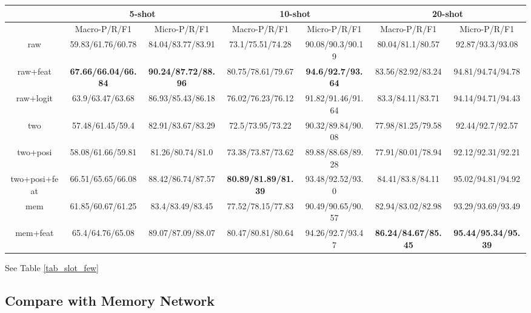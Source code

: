 \begin{table*}
\setlength{\tabcolsep}{0.23em}
\centering
\small{
\begin{tabular}{|c|c|c|c|c|c|c|}

\hline
  & \multicolumn{2}{|c|}{5-shot} & \multicolumn{2}{|c|}{10-shot} & \multicolumn{2}{|c|}{20-shot}  \\
 \hline
  & Macro-P/R/F1 & Micro-P/R/F1 & Macro-P/R/F1 & Micro-P/R/F1  & Macro-P/R/F1 & Micro-P/R/F1   \\
\hline
raw & 59.83/61.76/60.78 & 84.04/83.77/83.91 & 73.1/75.51/74.28  & 90.08/90.3/90.19 & 80.04/81.1/80.57 & 92.87/93.3/93.08 \\
\hline
raw+feat & \textbf{67.66/66.04/66.84} & \textbf{90.24/87.72/88.96} & 80.75/78.61/79.67 & \textbf{94.6/92.7/93.64} & 83.56/82.92/83.24 & 94.81/94.74/94.78 \\
\hline
raw+logit & 63.9/63.47/63.68 & 86.93/85.43/86.18 & 76.02/76.23/76.12 & 91.82/91.46/91.64  & 83.3/84.11/83.71 & 94.14/94.71/94.43 \\
\hline
two & 57.48/61.45/59.4 & 82.91/83.67/83.29 & 72.5/73.95/73.22 & 90.32/89.84/90.08 & 77.98/81.25/79.58 & 92.44/92.7/92.57 \\
\hline
two+posi & 58.08/61.66/59.81 & 81.26/80.74/81.0 & 73.38/73.87/73.62 & 89.88/88.68/89.28 & 77.91/80.01/78.94 & 92.12/92.31/92.21 \\
\hline
two+posi+feat & 66.51/65.65/66.08 & 88.42/86.74/87.57 & \textbf{80.89/81.89/81.39} & 93.48/92.52/93.0 & 84.41/83.8/84.11 & 95.02/94.81/94.92\\
\hline
mem & 61.85/60.67/61.25 & 83.4/83.49/83.45 & 77.52/78.15/77.83  & 90.49/90.65/90.57 & 82.94/83.02/82.98 & 93.29/93.69/93.49 \\
\hline
mem+feat & 65.4/64.76/65.08 & 89.07/87.09/88.07 & 80.47/80.81/80.64 & 94.26/92.7/93.47 & \textbf{86.24/84.67/85.45} & \textbf{95.44/95.34/95.39} \\
\hline
\end{tabular}
}
\caption{Slot Filling Result on Few-Shot Data}
\label{tab_slot_few}
\end{table*}
See Table \ref{tab_slot_few}


\subsection{Compare with Memory Network}

